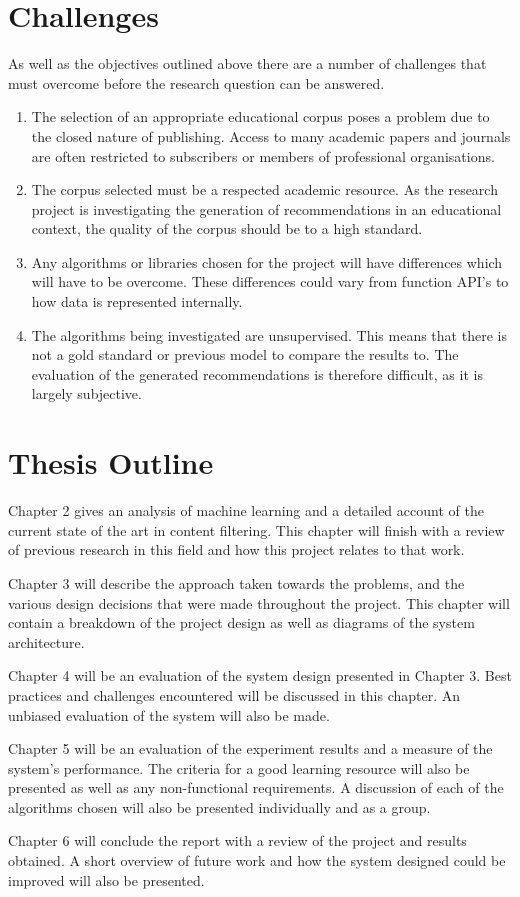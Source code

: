 \section{Challenges}
As well as the objectives outlined above there are a number of challenges that must overcome before the research question can be answered.

\begin{enumerate}
    \item The selection of an appropriate educational corpus poses a problem due to the closed nature of publishing.
    Access to many academic papers and journals are often restricted to subscribers or members of professional organisations.

    \item The corpus selected must be a respected academic resource.
    As the research project is investigating the generation of recommendations in an educational context, the quality of the corpus should be to a high standard.

    \item Any algorithms or libraries chosen for the project will have differences which will have to be overcome.
    These differences could vary from function API's to how data is represented internally.

    \item The algorithms being investigated are unsupervised.
    This means that there is not a gold standard or previous model to compare the results to.
    The evaluation of the generated recommendations is therefore difficult, as it is largely subjective.
\end{enumerate}

\section{Thesis Outline}
Chapter 2 gives an analysis of machine learning and a detailed account of the current state of the art in content filtering.
This chapter will finish with a review of previous research in this field and how this project relates to that work.

Chapter 3 will describe the approach taken towards the problems, and the various design decisions that were made throughout the project.
This chapter will contain a breakdown of the project design as well as diagrams of the system architecture.

Chapter 4 will be an evaluation of the system design presented in Chapter 3.
Best practices and challenges encountered will be discussed in this chapter.
An unbiased evaluation of the system will also be made.

Chapter 5 will be an evaluation of the experiment results and a measure of the system's performance.
The criteria for a good learning resource will also be presented as well as any non-functional requirements.
A discussion of each of the algorithms chosen will also be presented individually and as a group.

Chapter 6 will conclude the report with a review of the project and results obtained.
A short overview of future work and how the system designed could be improved will also be presented.

